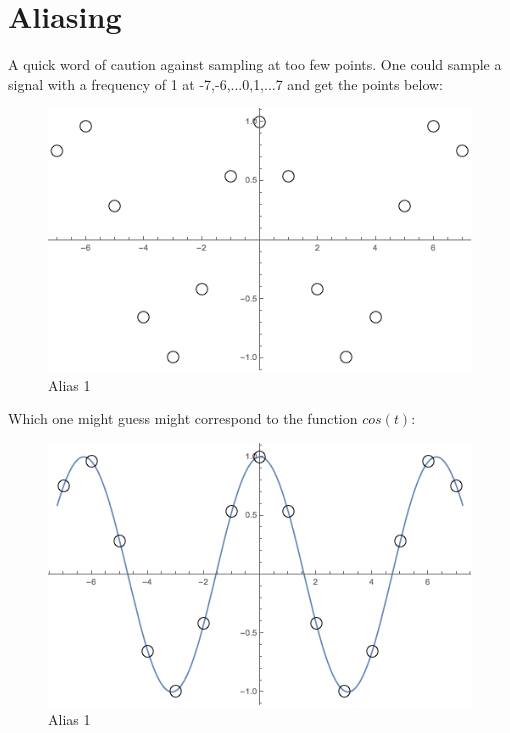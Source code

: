 \documentclass[titlepage]{article}
\begin{document}
\section{Aliasing}

A quick word of caution against sampling at too few points. One could sample a signal with a frequency of 1 at -7,-6,...0,1,...7 and get the points below:

\begin{figure}[ht]
\centering
\includegraphics[scale = 0.5, center]{images/alias1.png}
\caption{Alias 1}
\label{fig:2d}
\end{figure}
\FloatBarrier

Which one might guess might correspond to the function $cos(t)$:

\begin{figure}[ht]
\centering
\includegraphics[scale = 0.5, center]{images/alias2.png}
\caption{Alias 1}
\label{fig:2d}
\end{figure}
\FloatBarrier
\end{document}
